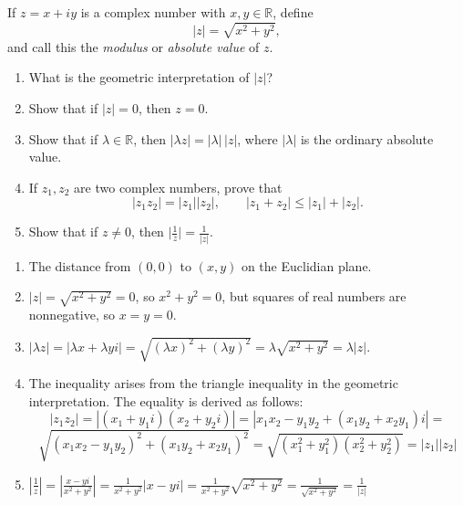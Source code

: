 \documentclass{../note}
\begin{document}
\begin{exercise}{1}
If $z = x + iy$ is a complex number with $x, y \in \mathbb{R}$, define
\[
|z| = \sqrt{x^2 + y^2},
\]
and call this the \emph{modulus} or \emph{absolute value} of $z$.

\begin{enumerate}[label=(\alph*)]
\item What is the geometric interpretation of $|z|$?
\item Show that if $|z| = 0$, then $z = 0$.
\item Show that if $\lambda \in \mathbb{R}$, then $|\lambda z| = |\lambda|\,|z|$, where $|\lambda|$ is the ordinary absolute value.
\item If $z_1, z_2$ are two complex numbers, prove that
\[
|z_1 z_2| = |z_1||z_2|, \qquad |z_1 + z_2| \le |z_1| + |z_2|.
\]
\item Show that if $z \ne 0$, then $\bigl|\frac{1}{z}\bigr| = \frac{1}{|z|}$.
\end{enumerate}
\end{exercise}
\begin{solution}
\begin{enumerate}[label=(\alph*)]
    \item The distance from $(0, 0)$ to $(x, y)$ on the Euclidian plane.
    \item $|z| = \sqrt{x^2 + y^2} = 0$, so $x^2 + y^2 = 0$, but squares of real numbers are nonnegative, so $x = y = 0$.
    \item $|\lambda z| = |\lambda x + \lambda yi| = \sqrt{(\lambda x)^2 + (\lambda y)^2} = \lambda \sqrt{x^2 + y^2} = \lambda |z|$.
    \item The inequality arises from the triangle inequality in the geometric interpretation. The equality is derived as follows: 
    \[|z_1z_2| = |(x_1 + y_1i)(x_2 + y_2i)| = |x_1x_2 - y_1y_2 + (x_1y_2 + x_2y_1)i| =\]
    \[ \sqrt{(x_1x_2 - y_1y_2)^2 + (x_1y_2 + x_2y_1)^2} = \sqrt{(x_1^2 + y_1^2)(x_2^2 + y_2^2)} = |z_1||z_2|\]
    \item $\left|\frac1z\right| = \left|\frac{x-yi}{x^2+y^2}\right| = \frac1{x^2+y^2} |x-yi| = \frac1{x^2+y^2}\sqrt{x^2+y^2} = \frac1{\sqrt{x^2+y^2}} = \frac1{|z|}$
\end{enumerate}
\end{solution}
\end{document}
